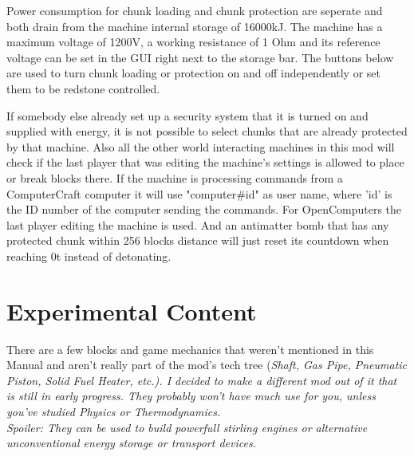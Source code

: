 \documentclass[11pt]{article} %
\begin{document}
Power consumption for chunk loading and chunk protection are seperate and both drain from the machine internal storage of 16000kJ. The machine has a maximum voltage of 1200V, a working resistance of 1 Ohm and its reference voltage can be set in the GUI right next to the storage bar. The buttons below are used to turn chunk loading or protection on and off independently or set them to be redstone controlled.

If somebody else already set up a security system that it is turned on and supplied with energy, it is not possible to select chunks that are already protected by that machine. Also all the other world interacting machines in this mod will check if the last player that was editing the machine's settings is allowed to place or break blocks there. If the machine is processing commands from a ComputerCraft computer it will use "computer\#id" as user name, where 'id' is the ID number of the computer sending the commands. For OpenComputers the last player editing the machine is used. And an antimatter bomb that has any protected chunk within 256 blocks distance will just reset its countdown when reaching 0t instead of detonating.

\section{Experimental Content}

There are a few blocks and game mechanics that weren't mentioned in this Manual and aren't really part of the mod's tech tree (\it Shaft, Gas Pipe, Pneumatic Piston, Solid Fuel Heater, etc.\rm). I decided to make a different mod out of it that is still in early progress. They probably won't have much use for you, unless you've studied Physics or Thermodynamics.\\
\it Spoiler: They can be used to build powerfull stirling engines or alternative unconventional energy storage or transport devices.\rm
\end{document}
